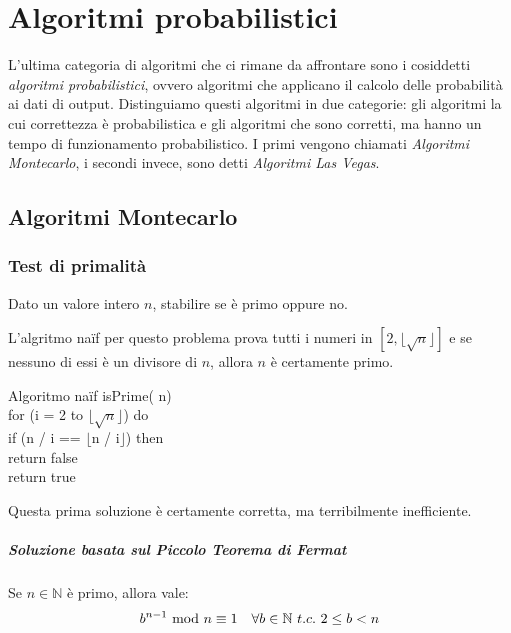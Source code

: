 \chapter{Algoritmi probabilistici}
L'ultima categoria di algoritmi che ci rimane da affrontare sono i
cosiddetti \emph{algoritmi probabilistici}, ovvero algoritmi che applicano
il calcolo delle probabilità ai dati di output. Distinguiamo questi
algoritmi in due categorie: gli algoritmi la cui correttezza è probabilistica
e gli algoritmi che sono corretti, ma hanno un tempo di funzionamento
probabilistico. I primi vengono chiamati \emph{Algoritmi Montecarlo},
i secondi invece, sono detti \emph{Algoritmi Las Vegas}.

\section{Algoritmi Montecarlo}
\subsection{Test di primalità}
\begin{problem}
    Dato un valore intero $n$, stabilire se è primo oppure no.
\end{problem}

\noindent
L'algritmo naïf per questo problema prova tutti i numeri in $[2,\lfloor
\sqrt{n}\rfloor]$ e se nessuno di essi è un divisore di $n$, allora $n$
è certamente primo.

\begin{minicode}{Algoritmo naïf}
\ind{} isPrime( n)\\
    \indf for (i = 2 to $\lfloor\sqrt{n}\rfloor$) do\\
        \indff if (n / i == $\lfloor$n / i$\rfloor$) then\\
            return false\\
    \indf return true
\end{minicode}

\noindent
Questa prima soluzione è certamente corretta, ma terribilmente inefficiente.

\paragraph{Soluzione basata sul Piccolo Teorema di Fermat}
\begin{definition}
    Se $n\in\mathbb{N}$ è primo, allora vale:
    \[b^{n-1}\ \mathrm{mod}\ n\equiv 1\quad\forall b\in\mathbb{N}\ t.c.\ 2\leq b<n\]
\end{definition}


